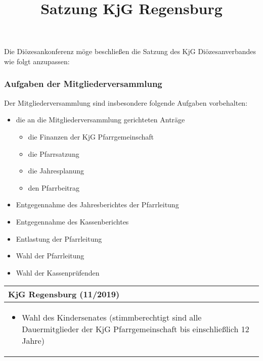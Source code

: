 \documentclass[12pt]{report}
\title{Satzung KjG Regensburg}
\author{}
\newcounter{tablecounter}
\newcommand\showcounter{\addtocounter{tablecounter}{1}\thetablecounter}
\begin{document}
\setcounter{page}{1}


\begin{flushleft}
Die Diözesankonferenz möge beschließen die Satzung des KjG Diözesanverbandes wie folgt anzupassen:


\subsubsection{Aufgaben der Mitgliederversammlung}
Der Mitgliederversammlung sind insbesondere folgende Aufgaben vorbehalten:
\begin{itemize}
  \item die an die Mitgliederversammlung gerichteten Anträge
    \begin{itemize}  
      \item die Finanzen der KjG Pfarrgemeinschaft
      \item die Pfarrsatzung
      \item die Jahresplanung
      \item den Pfarrbeitrag
    \end{itemize}
  \item Entgegennahme des Jahresberichtes der Pfarrleitung
  \item Entgegennahme des Kassenberichtes
  \item Entlastung der Pfarrleitung
  \item Wahl der Pfarrleitung
  \item Wahl der Kassenprüfenden
\end{itemize}
\begin{table}[H]
	\begin{tabular}{|l|}
		\hline
		\rowcolor[HTML]{FFCC67} 
		\rule[-1ex]{0pt}{4ex} \textbf{KjG Regensburg (11/2019)}     \hspace{0.6\textwidth} \showcounter        \\ \hline
		\rule[-1ex]{0pt}{4ex} \begin{minipage}[t]{\textwidth} 
\begin{itemize}
  \item Wahl des Kindersenates (stimmberechtigt sind alle Dauermitglieder der KjG Pfarrgemeinschaft bis einschließlich 12 Jahre)
\end{itemize}
			\rule[-1.2ex]{0pt}{0pt}
		\end{minipage}


\end{tabular}
\end{table}
\end{flushleft}
\end{document}

